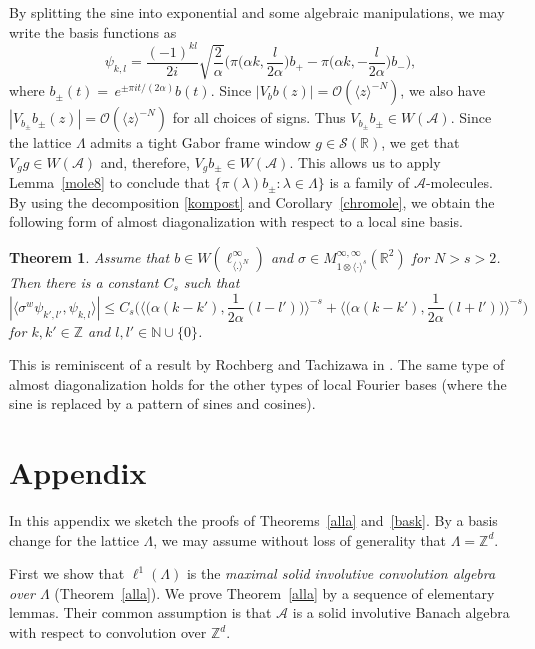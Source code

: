 \documentclass[12pt]{amsart}
\newtheorem{theorem}{Theorem}[section]
\theoremstyle{definition}
\theoremstyle{remark}
\numberwithin{equation}{section}
\def\cA{\mathcal{A}}
\def\cO{\mathcal{O}}
\def\bZ{{\mathbb{Z}}}
\def\zd{\bZ^d}
\def\cA{\mathcal{A}}
\def\cO{\mathcal{O}}
\newcommand{\bn}{\mathbb{N}}
\newcommand{\br}{\mathbb{R}}
\newcommand{\bz}{\mathbb{Z}}
\newcommand{\Cal}{\mathcal}
\newcommand{\la}{\lambda}
\newcommand{\La}{\Lambda}
\newcommand{\lan}{\langle}
\newcommand{\ran}{\rangle}
\newcommand{\ac}{\Cal A}
\begin{document}
By splitting the sine into exponential and some algebraic
manipulations,  we may write the basis functions as
\begin{equation}\label{kompost}
\psi_{k,l}=\frac{(-1)^{kl}}{2i} \sqrt{\frac 2 \alpha}  \bigg(
\pi\Big(\alpha k,\frac 
l{2\alpha}\Big) b_+ -\pi\Big(\alpha k,-\frac
l{2\alpha}\Big)b_- \bigg),
\end{equation}
where  $b_{\pm} (t)=\, e^{\pm \pi i t/(2\alpha)} b (t)$. 
Since $|V_bb (z) | = \cO (\langle z \rangle ^{-N})$, we also have
$|V_{b_{\pm } } b_{\pm }(z) | = \cO (\langle z \rangle ^{-N})$ for all
choices of signs. Thus $V_{b_{\pm } } b_{\pm } \in W(\ac)$. Since the lattice $\La$ admits a tight Gabor frame window $g\in \Cal S(\br)$, we get that $V_gg\in W(\ac)$ and, therefore, $V_{g } b_{\pm } \in W(\ac)$. This allows us to apply Lemma~\ref{mole8} to conclude that $\{\pi (\la ) b_{\pm }:\la\in\La\}$ is a family of $\ac$-molecules.
By using the decomposition \eqref{kompost} and Corollary~\ref{chromole}, we obtain
the following form of almost diagonalization with respect to a local
sine basis. 

\begin{theorem}
Assume that $b\in W(\ell ^\infty _{\langle   .\rangle ^N})$ and
$\sigma\in M^{\infty,\infty}_{1\otimes \langle 
\cdot\rangle^s}(\br^2)$ for $N>s>2$.  Then there is a constant $C_s$
such that
\[
|\lan \sigma^{w}\psi_{k',l'},\psi_{k,l}\ran|\le C_s \bigg(
\bigg\lan
\Big(\alpha(k-k'),\frac1{2\alpha}(l-l')\Big)\bigg\ran^{-s} +
\bigg\lan
\Big(\alpha(k-k'),\frac1{2\alpha}(l+l')\Big)\bigg\ran^{-s} \bigg)
\]
for $k,k'\in\bz$ and $l,l'\in\bn\cup\{0\}$.
\end{theorem}
This is reminiscent of a result by 
Rochberg and Tachizawa in \cite{tachizawa-rochberg98}.
The same type of almost diagonalization holds for the other types of
local Fourier bases (where the sine is replaced by a pattern of sines
and cosines). 
\section{Appendix}



In this appendix we sketch the  proofs of Theorems~\ref{alla}
and~\ref{bask}.
By a basis change for the lattice $\Lambda $, we may assume
without
loss of generality that $\Lambda = \zd $.

First we show that $\ell ^1(\Lambda )$ is the \emph{maximal solid
  involutive convolution algebra over $\Lambda $} (Theorem~\ref{alla}).
 We prove
Theorem~\ref{alla}
by a sequence of elementary lemmas. Their common assumption is
that
$\cA $ is a solid involutive  Banach algebra with respect to
convolution over $\zd $.
\end{document}
